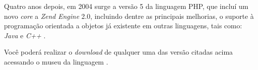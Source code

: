 Quatro anos depois, em 2004 surge a versão 5 da linguagem \acs{PHP}, que incluí
um novo \textit{core} a \textit{Zend Engine} 2.0, incluindo dentre as principais
melhorias, o suporte à programação orientada a objetos já existente
em outras linguagens, tais como: \textit{Java} e \textit{C++}
\cite{phpProgramandoComOrientacaoAObjetos}.

Você poderá realizar o \textit{download} de qualquer uma das versão citadas
acima acessando o museu da linguagem \cite{websitePHPMuseum}.